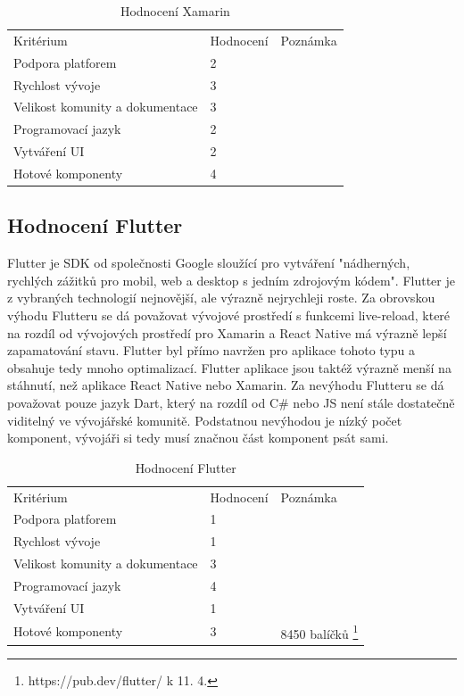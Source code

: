 \begin{table}[h]
	\begin{tabular}{lll}
		Kritérium                       & Hodnocení & Poznámka \\
		Podpora platforem & 2 &          \\
		Rychlost vývoje                 & 3 &          \\
		Velikost komunity a dokumentace & 3 &          \\
		Programovací jazyk              & 2 &          \\
		Vytváření UI                    & 2 &          \\
		Hotové komponenty               & 4 & 
	\end{tabular}
	\caption{Hodnocení Xamarin}
\end{table}

\subsection{Hodnocení Flutter}


Flutter je SDK od společnosti Google sloužící pro vytváření "nádherných, rychlých zážitků pro mobil, web a desktop s jedním zdrojovým kódem". Flutter je z vybraných technologií nejnovější, ale výrazně nejrychleji roste. Za obrovskou výhodu Flutteru se dá považovat vývojové prostředí s funkcemi live-reload, které na rozdíl od vývojových prostředí pro Xamarin a React Native má výrazně lepší zapamatování stavu. Flutter byl přímo navržen pro aplikace tohoto typu a obsahuje tedy mnoho optimalizací. Flutter aplikace jsou taktéž výrazně menší na stáhnutí, než aplikace React Native nebo Xamarin. Za nevýhodu Flutteru se dá považovat pouze jazyk Dart, který na rozdíl od C\# nebo JS není stále dostatečně viditelný ve vývojářské komunitě. Podstatnou nevýhodou je nízký počet komponent, vývojáři si tedy musí značnou část komponent psát sami.

\begin{table}[h]
	\begin{tabular}{lll}
		Kritérium                       & Hodnocení & Poznámka \\
		Podpora platforem               & 1 &          \\
		Rychlost vývoje                 & 1 &          \\
		Velikost komunity a dokumentace & 3 &          \\
		Programovací jazyk              & 4 &          \\
		Vytváření UI                    & 1 &          \\
		Hotové komponenty               & 3 & 8450 balíčků \footnote{https://pub.dev/flutter/ k 11. 4.}      
	\end{tabular}
	\caption{Hodnocení Flutter}
\end{table}

